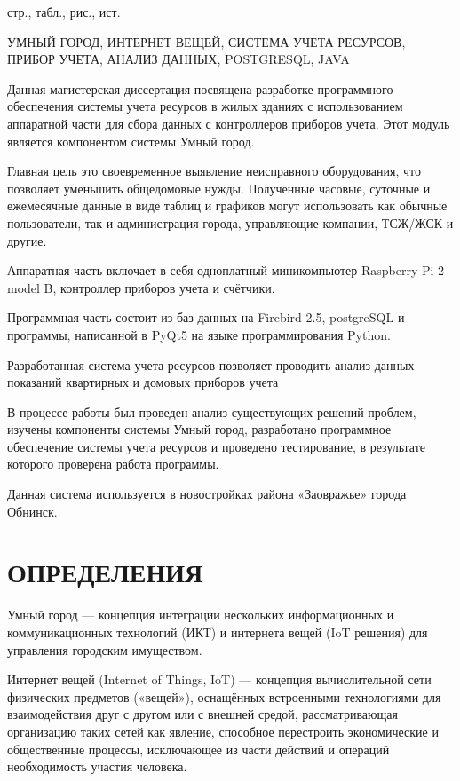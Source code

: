 \documentclass[a4paper,12pt]{article}
\newcounter{mycitecount}                                %
\begin{document}
 стр.,  табл.,  рис., \totalmycitecounts ист. 

УМНЫЙ ГОРОД, ИНТЕРНЕТ ВЕЩЕЙ, СИСТЕМА УЧЕТА РЕСУРСОВ, ПРИБОР УЧЕТА, АНАЛИЗ ДАННЫХ, POSTGRESQL, JAVA

Данная магистерская диссертация посвящена разработке программного обеспечения системы учета ресурсов в жилых зданиях с использованием аппаратной части для сбора данных с контроллеров приборов учета. Этот модуль является компонентом системы Умный город. 

Главная цель это своевременное выявление неисправного оборудования, что позволяет уменьшить общедомовые нужды.
Полученные часовые, суточные и ежемесячные данные в виде таблиц и графиков могут использовать как обычные пользователи, так и администрация города, управляющие компании, ТСЖ/ЖСК и другие.

Аппаратная часть включает в себя одноплатный миникомпьютер Raspberry Pi 2 model B, контроллер приборов учета и счётчики.

Программная часть состоит из баз данных на Firebird 2.5, postgreSQL и программы, написанной в PyQt5 на языке программирования Python.

Разработанная система учета ресурсов позволяет проводить анализ данных показаний квартирных и домовых приборов учета

В процессе работы был проведен анализ существующих решений проблем, изучены компоненты системы Умный город, разработано программное обеспечение системы учета ресурсов и проведено тестирование, в результате которого проверена работа программы.

Данная система используется в новостройках района «Заовражье» города Обнинск.

\pagebreak
\thispagestyle{empty}

\section*{\centering ОПРЕДЕЛЕНИЯ}

Умный город --- концепция интеграции нескольких информационных и коммуникационных технологий (ИКТ) и интернета вещей (IoT решения) для управления городским имуществом.

Интернет вещей (Internet of Things, IoT) --- концепция вычислительной сети физических предметов («вещей»), оснащённых встроенными технологиями для взаимодействия друг с другом или с внешней средой, рассматривающая организацию таких сетей как явление, способное перестроить экономические и общественные процессы, исключающее из части действий и операций необходимость участия человека. 
\end{document}
